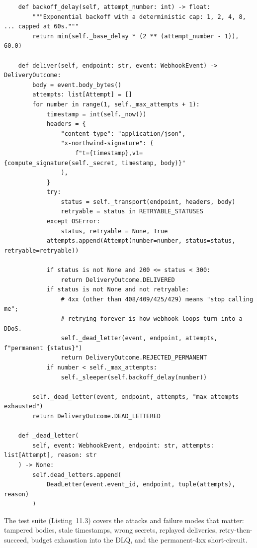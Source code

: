 \begin{verbatim}
    def backoff_delay(self, attempt_number: int) -> float:
        """Exponential backoff with a deterministic cap: 1, 2, 4, 8, ... capped at 60s."""
        return min(self._base_delay * (2 ** (attempt_number - 1)), 60.0)

    def deliver(self, endpoint: str, event: WebhookEvent) -> DeliveryOutcome:
        body = event.body_bytes()
        attempts: list[Attempt] = []
        for number in range(1, self._max_attempts + 1):
            timestamp = int(self._now())
            headers = {
                "content-type": "application/json",
                "x-northwind-signature": (
                    f"t={timestamp},v1={compute_signature(self._secret, timestamp, body)}"
                ),
            }
            try:
                status = self._transport(endpoint, headers, body)
                retryable = status in RETRYABLE_STATUSES
            except OSError:
                status, retryable = None, True
            attempts.append(Attempt(number=number, status=status, retryable=retryable))

            if status is not None and 200 <= status < 300:
                return DeliveryOutcome.DELIVERED
            if status is not None and not retryable:
                # 4xx (other than 408/409/425/429) means "stop calling me";
                # retrying forever is how webhook loops turn into a DDoS.
                self._dead_letter(event, endpoint, attempts, f"permanent {status}")
                return DeliveryOutcome.REJECTED_PERMANENT
            if number < self._max_attempts:
                self._sleeper(self.backoff_delay(number))

        self._dead_letter(event, endpoint, attempts, "max attempts exhausted")
        return DeliveryOutcome.DEAD_LETTERED

    def _dead_letter(
        self, event: WebhookEvent, endpoint: str, attempts: list[Attempt], reason: str
    ) -> None:
        self.dead_letters.append(
            DeadLetter(event.event_id, endpoint, tuple(attempts), reason)
        )
\end{verbatim}

The test suite (Listing~11.3) covers the attacks and failure modes that
matter: tampered bodies, stale timestamps, wrong secrets, replayed
deliveries, retry-then-succeed, budget exhaustion into the DLQ, and the
permanent-4xx short-circuit.

